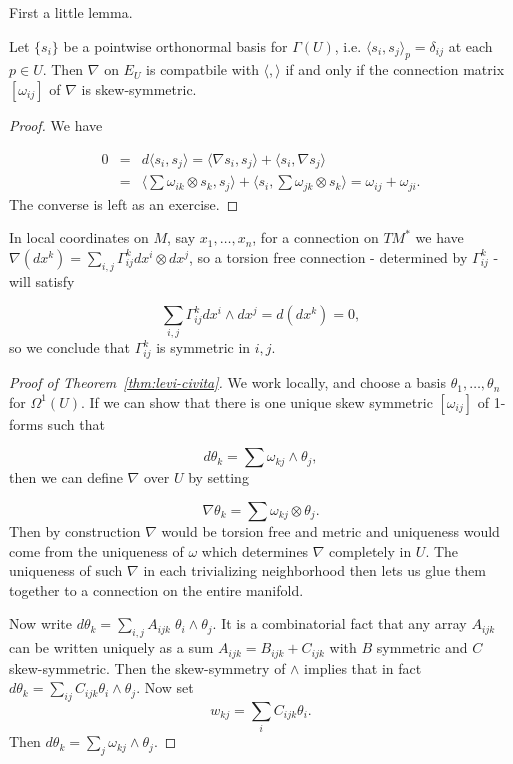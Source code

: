 \documentclass[a4paper,openany]{scrbook}
\begin{document}
First a little lemma.

\begin{lemma} \label{skew-sym}
Let $\{s_i\}$ be a pointwise orthonormal basis for $\Gamma (U)$, i.e. $\langle s_i,s_j\rangle_p=\delta_{ij}$ at each $p \in U$. Then $\nabla$ on $E_U$ is compatbile with $\langle,\rangle$ if and only if the connection matrix $[\omega_{ij}]$ of $\nabla$ is skew-symmetric.
\end{lemma}

\begin{proof}
We have 

\begin{eqnarray*}
0&=& d \langle s_i,s_j\rangle=\langle\nabla s_i,s_j\rangle + \langle s_i,\nabla s_j\rangle \\
&=& \langle\sum \omega_{ik} \otimes s_k,s_j\rangle + \langle s_i,\sum \omega_{jk} \otimes s_k\rangle = \omega_{ij} + \omega_{ji}.
\end{eqnarray*} The converse is left as an exercise.
\end{proof}

In local coordinates on $M$, say $x_1,\dots,x_n$, for a connection on $TM^*$ we have $\nabla ( d x^k)=\sum_{i,j} \Gamma_{ij}^k  d x^i \otimes  d x^j$, so a torsion free connection - determined by $\Gamma_{ij}^k$ - will satisfy

\begin{equation*}
\sum_{i,j} \Gamma_{ij}^k  d x^i \wedge  d x^j = d ( d x^k)=0,
\end{equation*} so we conclude that $\Gamma_{ij}^k$ is symmetric in $i,j$.


\begin{proof}[Proof of Theorem~\ref{thm:levi-civita}]
We work locally, and choose a basis $\theta_1,\dots,\theta_n$ for $\Omega^1(U)$. If we can show that there is one unique skew symmetric $[\omega_{ij}]$ of 1-forms such that

\begin{equation}
 d \theta_k =\sum \omega_{kj} \wedge \theta_j, 
\end{equation} then we can define $\nabla$ over $U$ by setting

\begin{equation}
\nabla \theta_k = \sum \omega_{kj} \otimes \theta_j.
\end{equation} Then by construction $\nabla$ would be torsion free and metric and uniqueness would come from the uniqueness of $\omega$ which determines $\nabla$ completely in $U$. The uniqueness of such $\nabla$ in each trivializing neighborhood then lets us glue them together to a connection on the entire manifold. 

Now write $d\theta_k =\sum_{i,j} A_{ijk}\; \theta_i \wedge \theta_j$. It is a combinatorial fact that any array $A_{ijk}$ can be written uniquely as a sum $A_{ijk}=B_{ijk} + C_{ijk}$ with $B$ symmetric and $C$ skew-symmetric. Then the skew-symmetry of $\wedge$ implies that in fact $d\theta_k =\sum_{ij}C_{ijk} \theta_i \wedge \theta_j$. Now set 
\begin{equation*}
w_{kj}=\sum_i C_{ijk} \theta_i.
\end{equation*} Then $ d \theta_k = \sum_j \omega_{kj} \wedge \theta_j$.
\end{proof}
\end{document}
